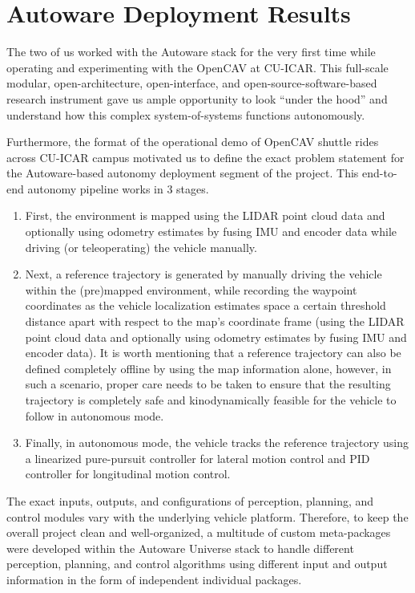 \hypertarget{Autoware Deployment Results}{%
\section{Autoware Deployment Results}\label{Autoware Deployment Results}}

The two of us worked with the Autoware stack for the very first time while operating and experimenting with the OpenCAV at CU-ICAR. This full-scale modular, open-architecture, open-interface, and open-source-software-based research instrument gave us ample opportunity to look ``under the hood'' and understand how this complex system-of-systems functions autonomously.

Furthermore, the format of the operational demo of OpenCAV shuttle rides across CU-ICAR campus motivated us to define the exact problem statement for the Autoware-based autonomy deployment segment of the project. This end-to-end autonomy pipeline works in 3 stages.

\begin{enumerate}
    \item First, the environment is mapped using the LIDAR point cloud data and optionally using odometry estimates by fusing IMU and encoder data while driving (or teleoperating) the vehicle manually.
    \item Next, a reference trajectory is generated by manually driving the vehicle within the (pre)mapped environment, while recording the waypoint coordinates as the vehicle localization estimates space a certain threshold distance apart with respect to the map's coordinate frame (using the LIDAR point cloud data and optionally using odometry estimates by fusing IMU and encoder data). It is worth mentioning that a reference trajectory can also be defined completely offline by using the map information alone, however, in such a scenario, proper care needs to be taken to ensure that the resulting trajectory is completely safe and kinodynamically feasible for the vehicle to follow in autonomous mode.
    \item Finally, in autonomous mode, the vehicle tracks the reference trajectory using a linearized pure-pursuit controller for lateral motion control and PID controller for longitudinal motion control.
\end{enumerate}

The exact inputs, outputs, and configurations of perception, planning, and control modules vary with the underlying vehicle platform. Therefore, to keep the overall project clean and well-organized, a multitude of custom meta-packages were developed within the Autoware Universe stack to handle different perception, planning, and control algorithms using different input and output information in the form of independent individual packages.

